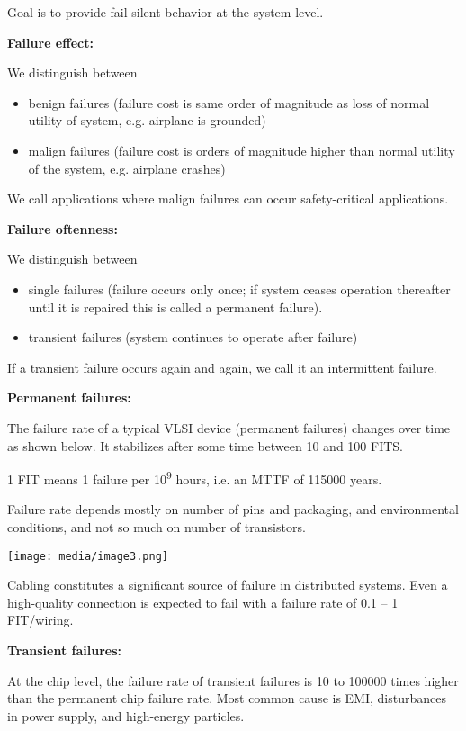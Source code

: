 Goal is to provide fail-silent behavior at the system level.

\textbf{Failure effect:}

We distinguish between

\begin{itemize}
\item
  benign failures (failure cost is same order of magnitude as loss of
  normal utility of system, e.g. airplane is grounded)
\item
  malign failures (failure cost is orders of magnitude higher than
  normal utility of the system, e.g. airplane crashes)
\end{itemize}

We call applications where malign failures can occur safety-critical
applications.

\textbf{Failure oftenness:}

We distinguish between

\begin{itemize}
\item
  single failures (failure occurs only once; if system ceases operation
  thereafter until it is repaired this is called a permanent failure).
\item
  transient failures (system continues to operate after failure)
\end{itemize}

If a transient failure occurs again and again, we call it an
intermittent failure.

\textbf{Permanent failures:}

The failure rate of a typical VLSI device (permanent failures) changes
over time as shown below. It stabilizes after some time between 10 and
100 FITS.

1 FIT means 1 failure per 10\textsuperscript{9} hours, i.e. an MTTF of
115000 years.

Failure rate depends mostly on number of pins and packaging, and
environmental conditions, and not so much on number of transistors.

\texttt{[image: media/image3.png]}

Cabling constitutes a significant source of failure in distributed
systems. Even a high-quality connection is expected to fail with a
failure rate of 0.1 -- 1 FIT/wiring.

\textbf{Transient failures:}

At the chip level, the failure rate of transient failures is 10 to
100000 times higher than the permanent chip failure rate. Most common
cause is EMI, disturbances in power supply, and high-energy particles.


